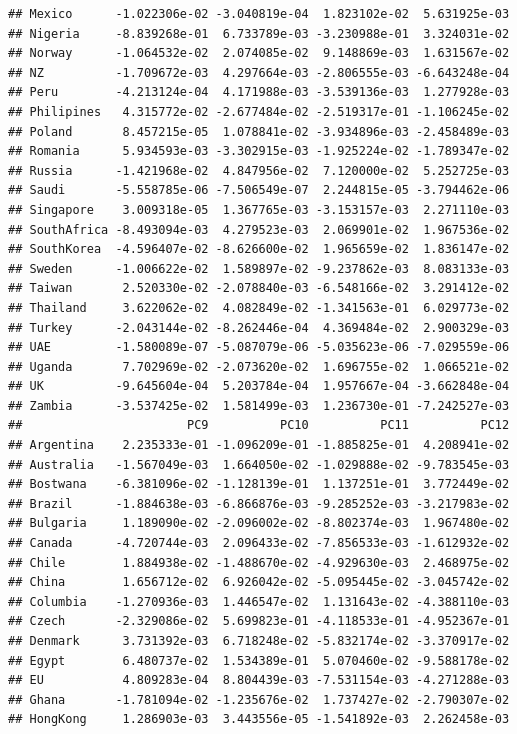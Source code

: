 \documentclass[11pt,preprint, authoryear]{elsarticle}
\numberwithin{equation}{section}
\numberwithin{figure}{section}
\numberwithin{table}{section}
\begin{document}
\begin{verbatim}
## Mexico      -1.022306e-02 -3.040819e-04  1.823102e-02  5.631925e-03
## Nigeria     -8.839268e-01  6.733789e-03 -3.230988e-01  3.324031e-02
## Norway      -1.064532e-02  2.074085e-02  9.148869e-03  1.631567e-02
## NZ          -1.709672e-03  4.297664e-03 -2.806555e-03 -6.643248e-04
## Peru        -4.213124e-04  4.171988e-03 -3.539136e-03  1.277928e-03
## Philipines   4.315772e-02 -2.677484e-02 -2.519317e-01 -1.106245e-02
## Poland       8.457215e-05  1.078841e-02 -3.934896e-03 -2.458489e-03
## Romania      5.934593e-03 -3.302915e-03 -1.925224e-02 -1.789347e-02
## Russia      -1.421968e-02  4.847956e-02  7.120000e-02  5.252725e-03
## Saudi       -5.558785e-06 -7.506549e-07  2.244815e-05 -3.794462e-06
## Singapore    3.009318e-05  1.367765e-03 -3.153157e-03  2.271110e-03
## SouthAfrica -8.493094e-03  4.279523e-03  2.069901e-02  1.967536e-02
## SouthKorea  -4.596407e-02 -8.626600e-02  1.965659e-02  1.836147e-02
## Sweden      -1.006622e-02  1.589897e-02 -9.237862e-03  8.083133e-03
## Taiwan       2.520330e-02 -2.078840e-03 -6.548166e-02  3.291412e-02
## Thailand     3.622062e-02  4.082849e-02 -1.341563e-01  6.029773e-02
## Turkey      -2.043144e-02 -8.262446e-04  4.369484e-02  2.900329e-03
## UAE         -1.580089e-07 -5.087079e-06 -5.035623e-06 -7.029559e-06
## Uganda       7.702969e-02 -2.073620e-02  1.696755e-02  1.066521e-02
## UK          -9.645604e-04  5.203784e-04  1.957667e-04 -3.662848e-04
## Zambia      -3.537425e-02  1.581499e-03  1.236730e-01 -7.242527e-03
##                       PC9          PC10          PC11          PC12
## Argentina    2.235333e-01 -1.096209e-01 -1.885825e-01  4.208941e-02
## Australia   -1.567049e-03  1.664050e-02 -1.029888e-02 -9.783545e-03
## Bostwana    -6.381096e-02 -1.128139e-01  1.137251e-01  3.772449e-02
## Brazil      -1.884638e-03 -6.866876e-03 -9.285252e-03 -3.217983e-02
## Bulgaria     1.189090e-02 -2.096002e-02 -8.802374e-03  1.967480e-02
## Canada      -4.720744e-03  2.096433e-02 -7.856533e-03 -1.612932e-02
## Chile        1.884938e-02 -1.488670e-02 -4.929630e-03  2.468975e-02
## China        1.656712e-02  6.926042e-02 -5.095445e-02 -3.045742e-02
## Columbia    -1.270936e-03  1.446547e-02  1.131643e-02 -4.388110e-03
## Czech       -2.329086e-02  5.699823e-01 -4.118533e-01 -4.952367e-01
## Denmark      3.731392e-03  6.718248e-02 -5.832174e-02 -3.370917e-02
## Egypt        6.480737e-02  1.534389e-01  5.070460e-02 -9.588178e-02
## EU           4.809283e-04  8.804439e-03 -7.531154e-03 -4.271288e-03
## Ghana       -1.781094e-02 -1.235676e-02  1.737427e-02 -2.790307e-02
## HongKong     1.286903e-03  3.443556e-05 -1.541892e-03  2.262458e-03

\end{verbatim}
\end{document}
